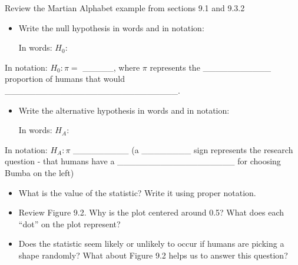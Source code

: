 \documentclass[
]{report}
\providecommand{\tightlist}{%
  \setlength{\itemsep}{0pt}\setlength{\parskip}{0pt}}
\newcommand{\rgi}{\hspace{24pt}}  %
\begin{document}
Review the Martian Alphabet example from sections 9.1 and 9.3.2

\begin{itemize}
\item
  Write the null hypothesis in words and in notation:

  \rgi \rgi In words: \(H_0:\)
\end{itemize}

\vspace{0.4in}

\rgi \rgi In notation: \(H_0:\pi=\) \_\_\_\_\_, where \(\pi\) represents the \_\_\_\_\_\_\_\_\_\_\_ proportion of humans that would \_\_\_\_\_\_\_\_\_\_\_\_\_\_\_\_\_\_\_\_\_\_\_\_\_\_\_\_.

\begin{itemize}
\item
  Write the alternative hypothesis in words and in notation:

  \rgi \rgi In words: \(H_A:\)
\end{itemize}

\vspace{0.4in}

\rgi \rgi In notation: \(H_A:\pi\) \_\_\_\_\_\_\_\_\_ (a \_\_\_\_\_\_\_\_ sign represents the research question - that humans have a \_\_\_\_\_\_\_\_\_\_\_\_\_\_\_\_\_\_\_ for choosing Bumba on the left)

\begin{itemize}
\tightlist
\item
  What is the value of the statistic? Write it using proper notation.
\end{itemize}

\vspace{0.2in}

\begin{itemize}
\tightlist
\item
  Review Figure 9.2. Why is the plot centered around 0.5? What does each ``dot'' on the plot represent?
\end{itemize}

\vspace{0.4in}

\begin{itemize}
\tightlist
\item
  Does the statistic seem likely or unlikely to occur if humans are picking a shape randomly? What about Figure 9.2 helps us to answer this question?
\end{itemize}

\vspace{0.4in}
\end{document}
